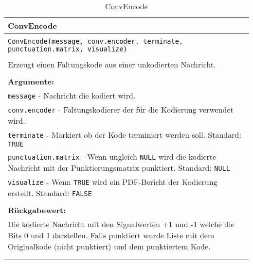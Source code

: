 \begin{longtable}{|p{\textwidth}|}
\hline
\rowcolor{lightblue}
ConvEncode
\\
\hline
\\
\texttt{ConvEncode(message, conv.encoder, terminate, punctuation.matrix, visualize)}\\
\\
Erzeugt einen Faltungskode aus einer unkodierten Nachricht.\\
\\
\textbf{Argumente:}\\
\texttt{message} - Nachricht die kodiert wird.\\
\texttt{conv.encoder} - Faltungskodierer der für die Kodierung verwendet wird.\\
\texttt{terminate} - Markiert ob der Kode terminiert werden soll. Standard: \texttt{TRUE}\\
\texttt{punctuation.matrix} - Wenn ungleich \texttt{NULL} wird die kodierte Nachricht mit der Punktierungsmatrix punktiert. Standard: \texttt{NULL}\\
\texttt{visualize} - Wenn \texttt{TRUE} wird ein PDF-Bericht der Kodierung erstellt. Standard: \texttt{FALSE}\\
\\
\textbf{Rückgabewert:}\\
Die kodierte Nachricht mit den Signalwerten +1 und -1 welche die Bits 0 und 1 darstellen. Falls punktiert wurde Liste mit dem Originalkode (nicht punktiert) und dem punktiertem Kode.\\
\\
\hline
\caption{ConvEncode}
\end{longtable}